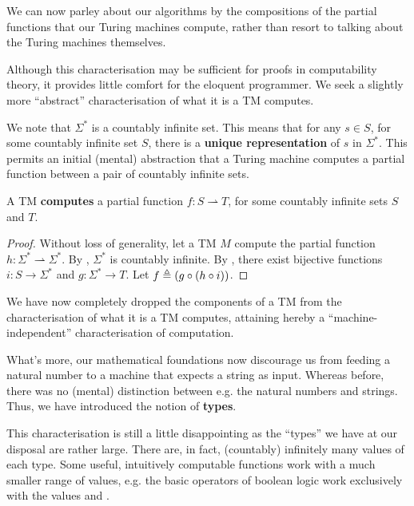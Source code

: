 We can now parley about our algorithms by the compositions of the partial
functions that our Turing machines compute, rather than resort to talking about
the Turing machines themselves.

Although this characterisation may be sufficient for proofs in computability
theory, it provides little comfort for the eloquent programmer. We seek a
slightly more ``abstract'' characterisation of what it is a TM computes.

We note that $\Sigma^*$ is a countably infinite set. This means that for any $s
\in S$, for some countably infinite set $S$, there is a \textbf{unique
representation} of $s$ in $\Sigma^*$. This permits an initial (mental)
abstraction that a Turing machine computes a partial function between a pair of
countably infinite sets.

\begin{theorem} \label{thm:tm-countably-infinite} A TM \textbf{computes} a
partial function $f : S \rightharpoonup T$, for some countably infinite sets
$S$ and $T$.\end{theorem}

\begin{proof} Without loss of generality, let a TM $M$ compute the partial
function $h : \Sigma^* \rightharpoonup \Sigma^*$. By
, $\Sigma^*$ is countably infinite. By
, there exist bijective
functions $i : S \rightarrow \Sigma^*$ and $g : \Sigma^* \rightarrow T$.  Let
$f \triangleq \mathopen{}\left({g \circ \mathopen{}\left({h \circ i}\right)\mathclose{}}\right)\mathclose{}$.\end{proof}

\begin{remark} We have now completely dropped the components of a TM from the
characterisation of what it is a TM computes, attaining hereby a
``machine-independent'' characterisation of computation.
\end{remark}

What's more, our mathematical foundations now discourage us from feeding a
natural number to a machine that expects a string as input. Whereas before,
there was no (mental) distinction between e.g. the natural numbers and strings.
Thus, we have introduced the notion of \textbf{types}.

This characterisation is still a little disappointing as the ``types'' we have
at our disposal are rather large. There are, in fact, (countably) infinitely
many values of each type. Some useful, intuitively computable functions work
with a much smaller range of values, e.g. the basic operators of boolean logic
work exclusively with the values \strue{} and \sfalse{}.

